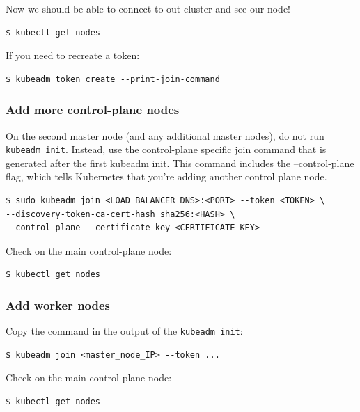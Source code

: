 \documentclass{article}
\newenvironment{codetemplate}[1][]{%
  \mybasecolorbox[#1]
  \itshape
}{%
  \endmybasecolorbox
}
\begin{document}
Now we should be able to connect to out cluster and see our node!
\begin{codetemplate}{}
\begin{verbatim}
$ kubectl get nodes
\end{verbatim}
\end{codetemplate}

If you need to recreate a token:
\begin{codetemplate}{}
\begin{verbatim}
$ kubeadm token create --print-join-command
\end{verbatim}
\end{codetemplate}

\subsubsection{Add more control-plane nodes}
On the second master node (and any additional master nodes), do not run \verb|kubeadm init|. Instead, use the control-plane specific join command that is generated after the first kubeadm init. This command includes the --control-plane flag, which tells Kubernetes that you're adding another control plane node.
\begin{codetemplate}{}
\begin{verbatim}
$ sudo kubeadm join <LOAD_BALANCER_DNS>:<PORT> --token <TOKEN> \
--discovery-token-ca-cert-hash sha256:<HASH> \
--control-plane --certificate-key <CERTIFICATE_KEY>
\end{verbatim}
\end{codetemplate}

Check on the main control-plane node:
\begin{codetemplate}{}
\begin{verbatim}
$ kubectl get nodes
\end{verbatim}
\end{codetemplate}

\subsubsection{Add worker nodes}
Copy the command in the output of the \verb|kubeadm init|:
\begin{codetemplate}{}
\begin{verbatim}
$ kubeadm join <master_node_IP> --token ...
\end{verbatim}
\end{codetemplate}

Check on the main control-plane node:
\begin{codetemplate}{}
\begin{verbatim}
$ kubectl get nodes
\end{verbatim}
\end{codetemplate}
\end{document}
